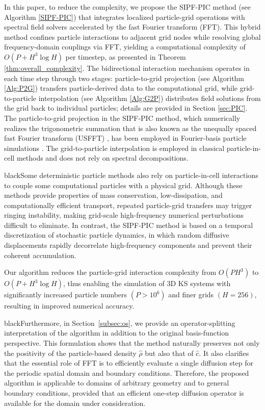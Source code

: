 \documentclass[review,onefignum,onetabnum]{siamart250211}
\begin{document}
In this paper, to reduce the complexity, we propose the SIPF-PIC method (see Algorithm \ref{SIPF-PIC}) that integrates localized particle-grid operations with spectral field solvers accelerated by the fast Fourier transform (FFT). This hybrid method confines particle interactions to adjacent grid nodes while resolving global frequency-domain couplings via FFT, yielding a computational complexity of $O\left(P + H^3 \log H\right)$ per timestep, as presented in Theorem \ref{thm:overall_complexity}. The bidirectional interaction mechanism operates in each time step through two stages: particle-to-grid projection (see Algorithm \ref{Alg:P2G}) transfers particle-derived data to the computational grid, while grid-to-particle interpolation (see Algorithm \ref{Alg:G2P}) distributes field solutions from the grid back to individual particles; details are provided in Section \ref{sec:PIC}. The particle-to-grid projection in the SIPF-PIC method, which numerically realizes the trigonometric summation that is also known as the unequally spaced fast Fourier transform (USFFT) \cite{USFFT}, has been employed in Fourier-basis particle simulations \cite{USFFTS}. The grid-to-particle interpolation is employed in classical particle-in-cell methods \cite{alma99,TskhakayaD.2007TPM} and does not rely on spectral decompositions. \begin{color}{black}Some deterministic particle methods \cite{coppa96,cho18} also rely on particle-in-cell interactions to couple some computational particles with a physical grid. Although these methods provide properties of mass conservation, low-dissipation, and computationally efficient transport, repeated particle-grid transfers may trigger ringing instability, making grid-scale high-frequency numerical perturbations difficult to eliminate. In contrast, the SIPF-PIC method is based on a temporal discretization of stochastic particle dynamics, in which random diffusive displacements rapidly decorrelate high-frequency components and prevent their coherent accumulation.\end{color}

Our algorithm reduces the particle-grid interaction complexity from $O\left(P H^3\right)$ to $O\left(P + H^3 \log H\right)$, thus enabling the simulation of 3D KS systems with significantly increased particle numbers $(P>10^6)$ and finer grids $(H=256)$, resulting in improved numerical accuracy. \begin{color}{black}Furthermore, in Section~\ref{subsec:os}, we provide an operator-splitting interpretation of the algorithm in addition to the original basis-function perspective. This formulation shows that the method naturally preserves not only the positivity of the particle-based density $\hat{\rho}$ but also that of $\hat{c}$. It also clarifies that the essential role of FFT is to efficiently evaluate a single diffusion step for the periodic spatial domain and boundary conditions. Therefore, the proposed algorithm is applicable to domains of arbitrary geometry and to general boundary conditions, provided that an efficient one-step diffusion operator is available for the domain under consideration.\end{color}
\end{document}
